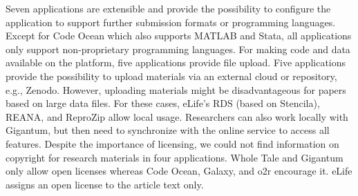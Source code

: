 \documentclass[onecolumn]{article}
\begin{document}
Seven applications are extensible and provide the possibility to
configure the application to support further submission formats or
programming languages. Except for Code Ocean which also supports MATLAB
and Stata, all applications only support non-proprietary programming
languages. For making code and data available on the platform, five
applications provide file upload. Five applications provide the
possibility to upload materials via an external cloud or repository,
e.g., Zenodo. However, uploading materials might be disadvantageous for
papers based on large data files. For these cases, eLife's RDS (based on
Stencila), REANA, and ReproZip allow local usage. Researchers can also
work locally with Gigantum, but then need to synchronize with the online
service to access all features. Despite the importance of licensing, we
could not find information on copyright for research materials in four
applications. Whole Tale and Gigantum only allow open licenses whereas
Code Ocean, Galaxy, and o2r encourage it. eLife assigns an open license
to the article text only.
\end{document}
